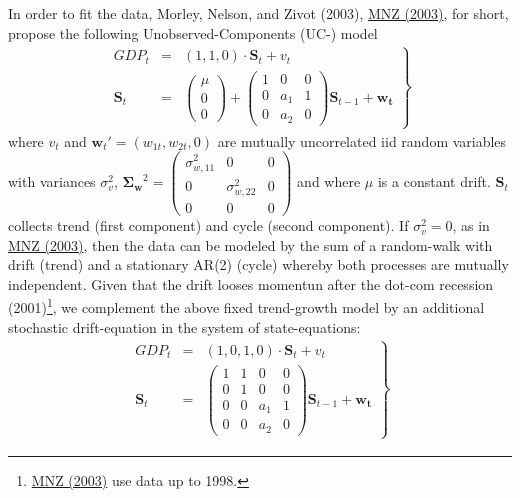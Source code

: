 \documentclass[a4paper]{book}
\begin{document}
In order to fit the data,  Morley, Nelson, and Zivot (2003), \href{https://www.dropbox.com/s/1qn5h7s02c86j8i/mnz03.pdf?dl=0}{MNZ (2003)}, for short, propose the following Unobserved-Components (UC-) model
\begin{eqnarray}
\left.\begin{array}{ccc}
GDP_t&=&(1,1,0)\cdot\mathbf{S}_t+{v}_t\\
\mathbf{S}_t&=&\left(\begin{array}{c}\mu\\0\\0\end{array}\right)+\left(\begin{array}{ccc}1&0&0\\                           
                            0&a_1&1\\
                            0&a_2&0
                            \end{array}\right)\mathbf{S}_{t-1}+\mathbf{w_t}\end{array}\right\}\label{ss_mod_gen_i1}
\end{eqnarray}
where $v_t$ and $\mathbf{w}_t'=(w_{1t},w_{2t},0)$ are mutually uncorrelated iid random variables with variances $\sigma_v^2$, $\boldsymbol{\Sigma_w}^2=\left(\begin{array}{ccc}\sigma_{w,11}^2&0&0\\0&\sigma_{w,22}^2&0\\0&0&0\end{array}\right)$ and where $\mu$ is a constant drift. $\mathbf{S}_t$ collects trend (first component) and cycle (second component). If $\sigma_v^2=0$, as in \href{https://www.dropbox.com/s/1qn5h7s02c86j8i/mnz03.pdf?dl=0}{MNZ (2003)}, then  the data can be modeled by the sum of a random-walk with drift (trend) and a stationary AR(2) (cycle) whereby both processes are mutually independent. Given that the drift looses momentun after the dot-com recession (2001)\footnote{\href{https://www.dropbox.com/s/1qn5h7s02c86j8i/mnz03.pdf?dl=0}{MNZ (2003)} use data up to 1998.},  we complement the above fixed trend-growth model by an additional stochastic drift-equation in the system of state-equations:
\begin{eqnarray}
\left.\begin{array}{ccc}GDP_t&=&(1,0,1,0)\cdot\mathbf{S}_t+v_t\\
\mathbf{S}_t&=&\left(\begin{array}{cccc}1&1&0&0\\
                            0&1&0&0\\
                            0&0&a_1&1\\
                            0&0&a_2&0
                            \end{array}\right)\mathbf{S}_{t-1}+\mathbf{w_t}\end{array}\right\}\label{ss_mod_gen_i2}
\end{eqnarray}
\end{document}
